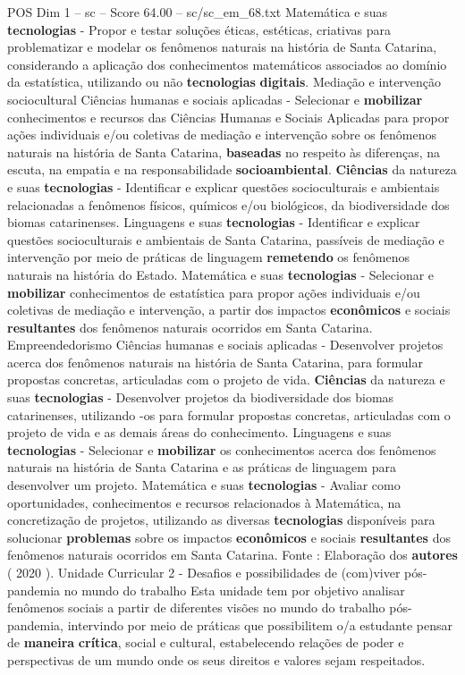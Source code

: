 \begin{textsample}{POS Dim 1 – sc – Score 64.00 – sc/sc\_em\_68.txt}
Matemática e suas \textbf{tecnologias} - Propor e testar soluções éticas, estéticas, criativas para problematizar e modelar os fenômenos naturais na história de Santa Catarina, considerando a aplicação dos conhecimentos matemáticos associados ao domínio da estatística, utilizando ou não \textbf{tecnologias} \textbf{digitais}.
Mediação e intervenção sociocultural Ciências humanas e sociais aplicadas - Selecionar e \textbf{mobilizar} conhecimentos e recursos das Ciências Humanas e Sociais Aplicadas para propor ações individuais e/ou coletivas de mediação e intervenção sobre os fenômenos naturais na história de Santa Catarina, \textbf{baseadas} no respeito às diferenças, na escuta, na empatia e na responsabilidade \textbf{socioambiental}. \textbf{Ciências} da natureza e suas \textbf{tecnologias} - Identificar e explicar questões socioculturais e ambientais relacionadas a fenômenos físicos, químicos e/ou biológicos, da biodiversidade dos biomas catarinenses.
Linguagens e suas \textbf{tecnologias} - Identificar e explicar questões socioculturais e ambientais de Santa Catarina, passíveis de mediação e intervenção por meio de práticas de linguagem \textbf{remetendo} os fenômenos naturais na história do Estado.
Matemática e suas \textbf{tecnologias} - Selecionar e \textbf{mobilizar} conhecimentos de estatística para propor ações individuais e/ou coletivas de mediação e intervenção, a partir dos impactos \textbf{econômicos} e sociais \textbf{resultantes} dos fenômenos naturais ocorridos em Santa Catarina.
Empreendedorismo Ciências humanas e sociais aplicadas - Desenvolver projetos acerca dos fenômenos naturais na história de Santa Catarina, para formular propostas concretas, articuladas com o projeto de vida. \textbf{Ciências} da natureza e suas \textbf{tecnologias} - Desenvolver projetos da biodiversidade dos biomas catarinenses, utilizando -os para formular propostas concretas, articuladas com o projeto de vida e as demais áreas do conhecimento.
Linguagens e suas \textbf{tecnologias} - Selecionar e \textbf{mobilizar} os conhecimentos acerca dos fenômenos naturais na história de Santa Catarina e as práticas de linguagem para desenvolver um projeto.
Matemática e suas \textbf{tecnologias} - Avaliar como oportunidades, conhecimentos e recursos relacionados à Matemática, na concretização de projetos, utilizando as diversas \textbf{tecnologias} disponíveis para solucionar \textbf{problemas} sobre os impactos \textbf{econômicos} e sociais \textbf{resultantes} dos fenômenos naturais ocorridos em Santa Catarina.
Fonte : Elaboração dos \textbf{autores} ( 2020 ).
Unidade Curricular 2 - Desafios e possibilidades de (com)viver pós-pandemia no mundo do trabalho Esta unidade tem por objetivo analisar fenômenos sociais a partir de diferentes visões no mundo do trabalho pós-pandemia, intervindo por meio de práticas que possibilitem o/a estudante pensar de \textbf{maneira} \textbf{crítica}, social e cultural, estabelecendo relações de poder e perspectivas de um mundo onde os seus direitos e valores sejam respeitados.

\end{textsample}

